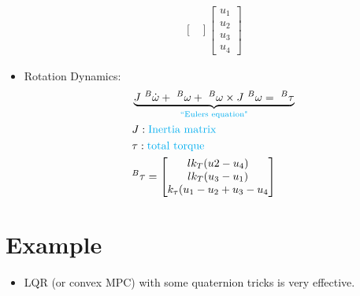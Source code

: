 \documentclass[11pt]{article}
\begin{document}
\begin{itemize}
\begin{align*}
\begin{bmatrix}
        \end{bmatrix}
        \begin{bmatrix}
            u_1 \\
            u_2 \\
            u_3 \\
            u_4
        \end{bmatrix}
    \end{align*}
    \item Rotation Dynamics:
    \begin{align*}
        &\underbrace{J \ ^B\dot{\omega} + \ ^ B\omega + \ ^ B\omega\times J \ ^B\omega = \ ^B\tau}_{\textcolor{cyan}{\text{``Eulers equation"}}}
        \\
        &J: \textcolor{cyan}{\text{Inertia matrix}}
        \\
        &\tau :\textcolor{cyan}{\text{total torque}}
        \\
        & ^B\tau = \begin{bmatrix}
            l k_T(u2-u_4) \\
            lk_T(u_3-u_1) \\
            k_\tau(u_1-u_2 + u_3-u_4
        \end{bmatrix}
    \end{align*}
\end{itemize}

\section{Example}
\begin{itemize}
    \item LQR (or convex MPC) with some quaternion tricks is very effective.
\end{itemize}
\end{document}
